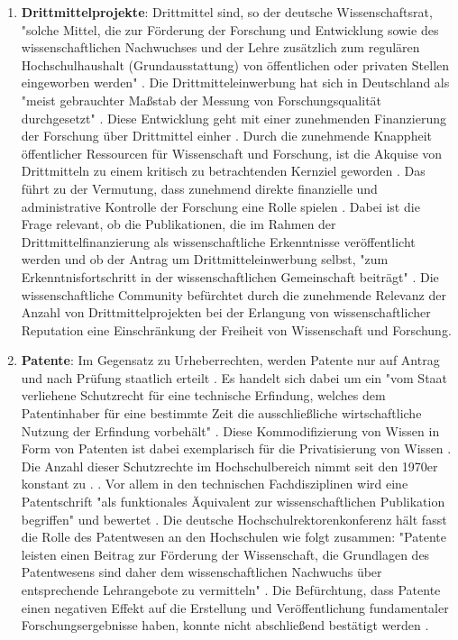 \begin{enumerate}
\item \textbf{Drittmittelprojekte}: Drittmittel sind, so der deutsche Wissenschaftsrat, "solche Mittel, die zur Förderung der Forschung und Entwicklung sowie des wissenschaftlichen Nachwuchses und der Lehre zusätzlich zum regulären Hochschulhaushalt (Grundausstattung) von öffentlichen oder privaten Stellen eingeworben werden" \cite{Wissenschaftsrat_2014}. Die Drittmitteleinwerbung hat sich in Deutschland als "meist gebrauchter Maßstab der Messung von Forschungsqualität durchgesetzt" \cite{Muench_2006}. Diese Entwicklung geht mit einer zunehmenden Finanzierung der Forschung über Drittmittel einher \cite{Neidhardt_2010} \cite{Jansen_2007} \cite{Simon_2009}. Durch die zunehmende Knappheit öffentlicher Ressourcen für Wissenschaft und Forschung, ist die Akquise von Drittmitteln zu einem kritisch zu betrachtenden Kernziel geworden \cite{Jansen_2007}. Das führt zu der Vermutung, dass zunehmend direkte finanzielle und administrative Kontrolle der Forschung eine Rolle spielen \cite{Barloesius_2008}. Dabei ist die Frage relevant, ob die Publikationen, die im Rahmen der Drittmittelfinanzierung als wissenschaftliche Erkenntnisse veröffentlicht werden und ob der Antrag um Drittmitteleinwerbung selbst, "zum Erkenntnisfortschritt in der wissenschaftlichen Gemeinschaft beiträgt" \cite{Muench_2006}. Die wissenschaftliche Community befürchtet durch die zunehmende Relevanz der Anzahl von Drittmittelprojekten bei der Erlangung von wissenschaftlicher Reputation eine Einschränkung der Freiheit von Wissenschaft und Forschung.
\item \textbf{Patente}: Im Gegensatz zu Urheberrechten, werden Patente nur auf Antrag und nach Prüfung staatlich erteilt \cite[:152]{Troy_2012}. Es handelt sich dabei um ein "vom Staat verliehene Schutzrecht für eine technische Erfindung, welches dem Patentinhaber für eine bestimmte Zeit die ausschließliche wirtschaftliche Nutzung der Erfindung vorbehält" \cite{Greif_2003}. Diese Kommodifizierung von Wissen in Form von Patenten ist dabei exemplarisch für die Privatisierung von Wissen \cite[:152]{Troy_2012}. Die Anzahl dieser Schutzrechte im Hochschulbereich nimmt seit den 1970er konstant zu \cite[:168]{Troy_2012}. \cite{Schmoch_2003} \cite{Fabrizio_2008}. Vor allem in den technischen Fachdisziplinen wird eine Patentschrift "als funktionales Äquivalent zur wissenschaftlichen Publikation begriffen" und bewertet \cite{Mersch_2014}. Die deutsche Hochschulrektorenkonferenz hält fasst die Rolle des Patentwesen an den Hochschulen wie folgt zusammen: "Patente leisten einen Beitrag zur Förderung der Wissenschaft, die Grundlagen des Patentwesens sind daher dem wissenschaftlichen Nachwuchs über entsprechende Lehrangebote zu vermitteln" \cite{Greif_2003}. Die Befürchtung, dass Patente einen negativen Effekt auf die Erstellung und Veröffentlichung fundamentaler Forschungsergebnisse haben, konnte nicht abschließend bestätigt werden \cite{Fabrizio_2008}.

\end{enumerate}
